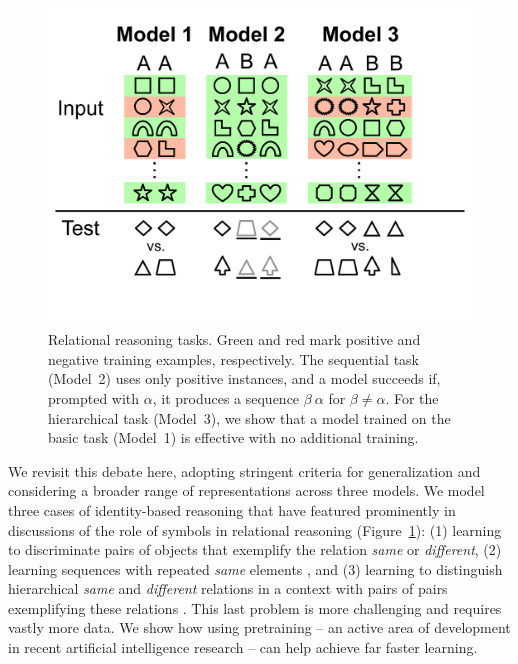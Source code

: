 \documentclass{article}
\newcommand{\figref}[1]{Figure~\ref{#1}}
\renewcommand{\cite}{\citep}
\begin{document}
\begin{figure}[tp]
\centering
\includegraphics[scale=0.20]{./modelfigv1.pdf}
\caption{Relational reasoning tasks. Green and red mark positive and negative training examples, respectively. The sequential task (Model~2) uses only positive instances, and a model succeeds if, prompted with $\alpha$, it produces a sequence $\beta \ \alpha$ for $\beta \neq \alpha$. For the hierarchical task (Model~3), we show that a model trained on the basic task (Model~1) is effective with no additional training.}
\label{fig:tasks}
\end{figure}

We revisit this debate here, adopting stringent criteria for generalization and considering a broader range of representations across three models. We model three cases of identity-based reasoning that have featured prominently in discussions of the role of symbols in relational reasoning (\figref{fig:tasks}): (1) learning to discriminate pairs of objects that exemplify the relation \emph{same} or \emph{different}, (2) learning sequences with repeated \emph{same} elements \cite{marcus:1999}, and (3) learning to distinguish hierarchical \emph{same} and \emph{different} relations in a context with pairs of pairs exemplifying these relations \cite{Premack:1983}. This last problem is more challenging and requires vastly more data. We show how using pretraining -- an active area of development in recent artificial intelligence research \cite{CollobertWeston:2011,Mikolov-etal:2013,pennington-socher-manning:2014:EMNLP2014,Peters-etal:2018,Devlin-etal:2019} -- can help achieve far faster learning.
\end{document}
